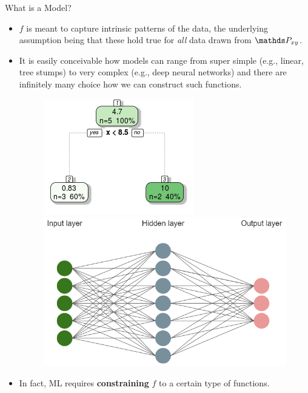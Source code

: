 \documentclass[11pt,compress,t,notes=noshow, xcolor=table]{beamer}
\begin{document}
\begin{vbframe}{What is a Model?}
\framebreak

\begin{itemize}

  \item $f$ is meant to capture intrinsic patterns of the data, the
  underlying assumption being that these hold true for \emph{all} data drawn 
  from $\Pxy$.
  
  \item It is easily conceivable how models can range from super simple (e.g., 
   linear, tree stumps) to very complex (e.g., deep neural networks) and there
   are infinitely many choice how we can construct such functions.
  
  \begin{figure}
  \begin{minipage}{0.4\textwidth}
    \centering
    \includegraphics[width=0.8\linewidth]{figure_man/monotone_trafo1.png}
  \end{minipage}%
  \begin{minipage}{0.6\textwidth}
    \centering
    \includegraphics[width=0.8\linewidth]{figure_man/network.PNG}
  \end{minipage}
  \end{figure}
  
  \vspace{0.2cm}
  
  \item In fact, ML requires \textbf{constraining} $f$ to a   certain type of functions.

\end{itemize}

\end{vbframe}
\end{document}
